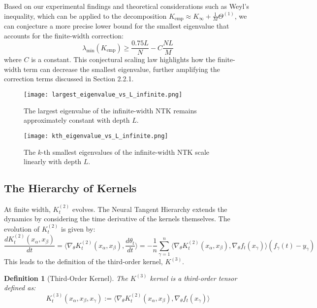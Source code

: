 \documentclass{article}
\newtheorem{definition}[theorem]{Definition}
\begin{document}
Based on our experimental findings and theoretical considerations such as Weyl's inequality, which can be applied to the decomposition $K_{\text{emp}} \approx K_\infty + \frac{1}{M}\Theta^{(1)}$, we can conjecture a more precise lower bound for the smallest eigenvalue that accounts for the finite-width correction:
\begin{equation}
\lambda_{\min}(K_{\text{emp}}) \ge \frac{0.75L}{N} - C \frac{NL}{M}
\label{eq:lambda_min_conjecture}
\end{equation}
where $C$ is a constant. This conjectural scaling law highlights how the finite-width term can decrease the smallest eigenvalue, further amplifying the correction terms discussed in Section 2.2.1.

\begin{figure}[h!]
    \centering
    \texttt{[image: largest\_eigenvalue\_vs\_L\_infinite.png]}
    \caption{The largest eigenvalue of the infinite-width NTK remains approximately constant with depth $L$.}
    \label{fig:largest_eigenvalue}
\end{figure}

\begin{figure}[h!]
    \centering
    \texttt{[image: kth\_eigenvalue\_vs\_L\_infinite.png]}
    \caption{The $k$-th smallest eigenvalues of the infinite-width NTK scale linearly with depth $L$.}
    \label{fig:k_eigenvalue}
\end{figure}

\subsection{The Hierarchy of Kernels}
At finite width, $K^{(2)}_t$ evolves. The Neural Tangent Hierarchy extends the dynamics by considering the time derivative of the kernels themselves. The evolution of $K^{(2)}_t$ is given by:
\begin{equation}
\frac{d K^{(2)}_t(x_\alpha, x_\beta)}{dt} = \langle \nabla_\theta K^{(2)}_t(x_\alpha, x_\beta), \frac{d\theta_t}{dt} \rangle = -\frac{1}{n} \sum_{\gamma=1}^n \langle \nabla_\theta K^{(2)}_t(x_\alpha, x_\beta), \nabla_\theta f_t(x_\gamma) \rangle (f_\gamma(t) - y_\gamma)
\end{equation}
This leads to the definition of the third-order kernel, $K^{(3)}$.

\begin{definition}[Third-Order Kernel]
The $K^{(3)}$ kernel is a third-order tensor defined as:
\begin{equation}
K^{(3)}_t(x_\alpha, x_\beta, x_\gamma) := \langle \nabla_\theta K^{(2)}_t(x_\alpha, x_\beta), \nabla_\theta f_t(x_\gamma) \rangle
\end{equation}
\end{definition}
\end{document}
